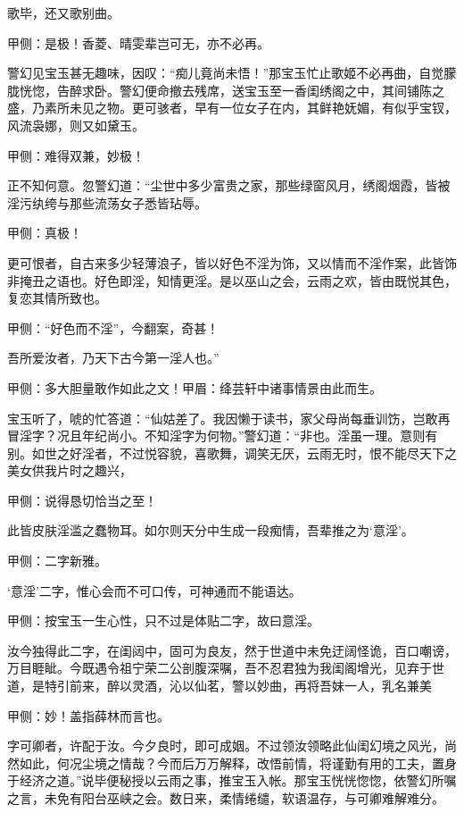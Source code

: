 \begin{parag}
    歌毕，还又歌别曲。\begin{note}甲侧：是极！香菱、晴雯辈岂可无，亦不必再。\end{note}警幻见宝玉甚无趣味，因叹：“痴儿竟尚未悟！”那宝玉忙止歌姬不必再曲，自觉朦胧恍惚，告醉求卧。警幻便命撤去残席，送宝玉至一香闺绣阁之中，其间铺陈之盛，乃素所未见之物。更可骇者，早有一位女子在内，其鲜艳妩媚，有似乎宝钗，风流袅娜，则又如黛玉。\begin{note}甲侧：难得双兼，妙极！\end{note}正不知何意。忽警幻道：“尘世中多少富贵之家，那些绿窗风月，绣阁烟霞，皆被淫污纨绔与那些流荡女子悉皆玷辱。\begin{note}甲侧：真极！\end{note}更可恨者，自古来多少轻薄浪子，皆以好色不淫为饰，又以情而不淫作案，此皆饰非掩丑之语也。好色即淫，知情更淫。是以巫山之会，云雨之欢，皆由既悦其色，复恋其情所致也。\begin{note}甲侧：“好色而不淫”，今翻案，奇甚！\end{note}吾所爱汝者，乃天下古今第一淫人也。”\begin{note}甲侧：多大胆量敢作如此之文！甲眉：绛芸轩中诸事情景由此而生。\end{note}宝玉听了，唬的忙答道：“仙姑差了。我因懒于读书，家父母尚每垂训饬，岂敢再冒淫字？况且年纪尚小。不知淫字为何物。”警幻道：“非也。淫虽一理。意则有别。如世之好淫者，不过悦容貌，喜歌舞，调笑无厌，云雨无时，恨不能尽天下之美女供我片时之趣兴，\begin{note}甲侧：说得恳切恰当之至！\end{note}此皆皮肤淫滥之蠢物耳。如尔则天分中生成一段痴情，吾辈推之为‘意淫’。\begin{note}甲侧：二字新雅。\end{note}‘意淫’二字，惟心会而不可口传，可神通而不能语达。\begin{note}甲侧：按宝玉一生心性，只不过是体贴二字，故曰意淫。\end{note}汝今独得此二字，在闺闼中，固可为良友，然于世道中未免迂阔怪诡，百口嘲谤，万目睚眦。今既遇令祖宁荣二公剖腹深嘱，吾不忍君独为我闺阁增光，见弃于世道，是特引前来，醉以灵酒，沁以仙茗，警以妙曲，再将吾妹一人，乳名兼美\begin{note}甲侧：妙！盖指薛林而言也。\end{note}字可卿者，许配于汝。今夕良时，即可成姻。不过领汝领略此仙闺幻境之风光，尚然如此，何况尘境之情哉？今而后万万解释，改悟前情，将谨勤有用的工夫，置身于经济之道。”说毕便秘授以云雨之事，推宝玉入帐。那宝玉恍恍惚惚，依警幻所嘱之言，未免有阳台巫峡之会。数日来，柔情绻缱，软语温存，与可卿难解难分。
\end{parag}


